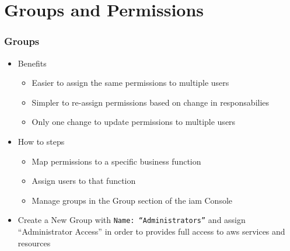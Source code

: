 \documentclass{beamer}
\begin{document}
\section{Groups and Permissions}
\begin{frame}[fragile]
\frametitle{Groups}
\begin{itemize}
\item Benefits
\begin{itemize}
 \item Easier to assign the same permissions to multiple users
 \item Simpler to re-assign permissions based on change in responsabilies
 \item Only one change to update permissions to multiple users
\end{itemize}
\item How to steps
\begin{itemize}
\item Map permissions to a specific business function
\item Assign users to that function
\item Manage groups in the Group section of the \acrshort{iam} Console
\end{itemize}
\item Create a New Group with \texttt{Name: ``Administrators''} and assign ``Administrator Access'' in order to provides full access to \acrshort{aws} services and resources
\end{itemize}
\end{frame}
\end{document}
